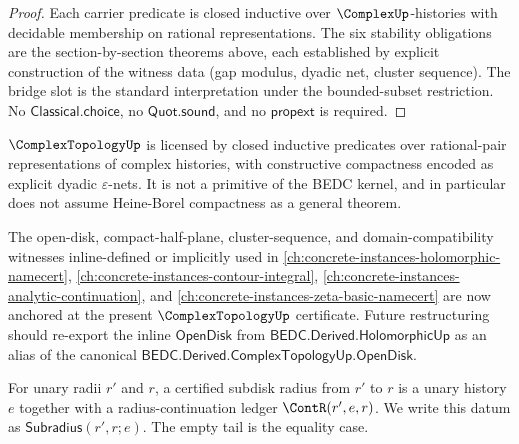 \begin{proof}
Each carrier predicate is closed inductive over \(\ComplexUp\)-histories with decidable membership on rational representations. The six stability obligations are the section-by-section theorems above, each established by explicit construction of the witness data (gap modulus, dyadic net, cluster sequence). The bridge slot is the standard interpretation under the bounded-subset restriction. No \(\mathsf{Classical.choice}\), no \(\mathsf{Quot.sound}\), and no \(\mathsf{propext}\) is required.
\end{proof}

\begin{corollary}
\label{cor:cplx-topo-licensed-not-primitive}
\(\ComplexTopologyUp\) is licensed by closed inductive predicates over rational-pair representations of complex histories, with constructive compactness encoded as explicit dyadic \(\varepsilon\)-nets. It is not a primitive of the BEDC kernel, and in particular does not assume Heine-Borel compactness as a general theorem.
\end{corollary}

\begin{remark}
\label{rem:cplx-topo-discharge-forward-refs}
The open-disk, compact-half-plane, cluster-sequence, and domain-compatibility witnesses inline-defined or implicitly used in \autoref{ch:concrete-instances-holomorphic-namecert}, \autoref{ch:concrete-instances-contour-integral}, \autoref{ch:concrete-instances-analytic-continuation}, and \autoref{ch:concrete-instances-zeta-basic-namecert} are now anchored at the present \(\ComplexTopologyUp\) certificate. Future restructuring should re-export the inline \(\mathsf{OpenDisk}\) from \(\mathsf{BEDC.Derived.HolomorphicUp}\) as an alias of the canonical \(\mathsf{BEDC.Derived.ComplexTopologyUp.OpenDisk}\).
\end{remark}

\begin{definition}
\label{def:holo-certified-subdisk-radius}
For unary radii $r'$ and $r$, a certified subdisk radius from $r'$ to $r$ is a unary history $e$ together with a radius-continuation ledger $\ContR(r',e,r)$. We write this datum as $\mathsf{Subradius}(r',r;e)$. The empty tail is the equality case.
\end{definition}

